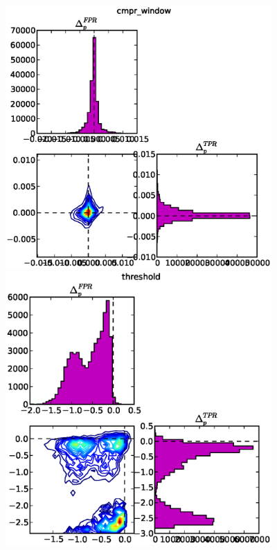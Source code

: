 \begin{figure}[!h]
\begin{center}
\includegraphics[width=4in]{../fig/final/delta_hist/cmpr_window}
\includegraphics[width=4in]{../fig/final/delta_hist/threshold}
\end{center}
\caption{\label{fig:deltas2}}
\end{figure}

